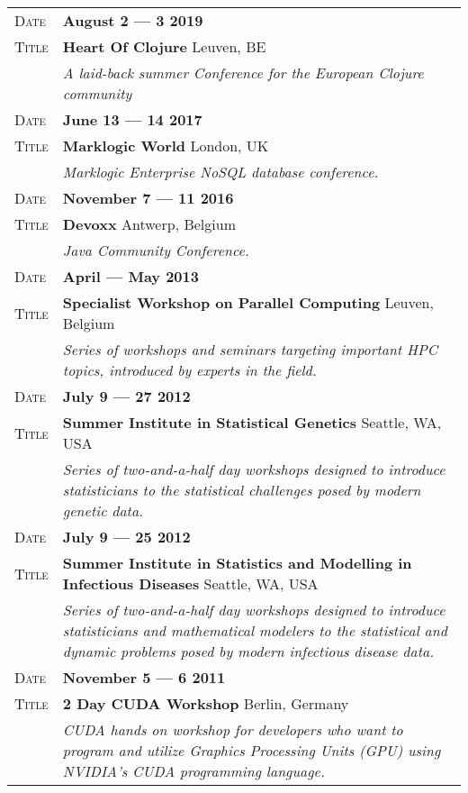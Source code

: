 \documentclass[a4paper, oneside, final]{scrartcl}
\newcommand{\gray}{\rowcolor[gray]{.90}}
\begin{document}
\begin{center}
\begin{tabularx}{0.97\linewidth}{>{\raggedleft\scshape}p{2cm}X}
      \gray Date & \textbf{August 2 --- 3 2019}\\
      \gray Title  & \textbf{Heart Of Clojure} \hfill Leuven, BE\\
      & \emph{ A laid-back summer Conference for the European Clojure community }
      \\

             \gray Date & \textbf{June 13 --- 14 2017}\\
    \gray Title  & \textbf{Marklogic World} \hfill London, UK\\
           & \emph{Marklogic Enterprise NoSQL database conference.}
   \\

             \gray Date & \textbf{November 7 --- 11 2016}\\
    \gray Title  & \textbf{Devoxx} \hfill Antwerp, Belgium\\
           & \emph{Java Community Conference.}
   \\

             \gray Date & \textbf{April --- May 2013}\\
    \gray Title  & \textbf{Specialist Workshop on Parallel Computing} \hfill Leuven, Belgium\\
           & \emph{Series of workshops and seminars targeting important HPC topics, introduced by experts in the field.}
   \\

         \gray Date & \textbf{July 9 --- 27 2012}\\
    \gray Title  & \textbf{Summer Institute in Statistical Genetics} \hfill Seattle, WA, USA\\
           & \emph{Series of two-and-a-half day workshops designed to introduce statisticians to the statistical challenges posed by modern genetic data.}
   \\

        \gray Date & \textbf{July 9 --- 25 2012}\\
    \gray Title  & \textbf{Summer Institute in Statistics and Modelling in Infectious Diseases} \hfill Seattle, WA, USA\\
           & \emph{Series of two-and-a-half day workshops designed to introduce statisticians and mathematical modelers to the statistical and dynamic problems posed by modern infectious disease data.}
   \\

       \gray Date & \textbf{November 5 --- 6 2011}\\
    \gray Title  & \textbf{2 Day CUDA Workshop} \hfill Berlin, Germany\\
           & \emph{CUDA hands on workshop for developers who want to program and utilize Graphics Processing Units (GPU) using NVIDIA’s CUDA programming language.}
   \\


\end{tabularx}
\end{center}
\end{document}
